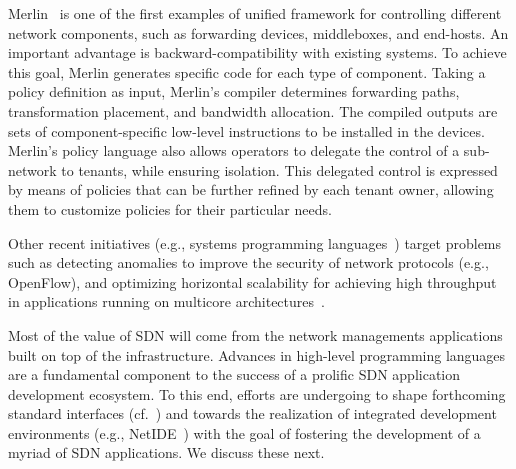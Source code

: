 Merlin~\cite{soule2013} is one of the first examples of unified framework for controlling different network components, such as forwarding devices, middleboxes, and end-hosts.
An important advantage is backward-compatibility with existing systems.
To achieve this goal, Merlin generates specific code for each type of component.
Taking a policy definition as input, Merlin's compiler determines forwarding 
paths, transformation placement, and bandwidth allocation.
The compiled outputs are sets of component-specific 
low-level instructions to be installed in the devices.
Merlin's policy language also allows operators to delegate the control of a sub-network to tenants, while ensuring isolation.
This delegated control is expressed by means of policies that can be further refined 
by each tenant owner, allowing them to customize policies for their particular needs. 

Other recent initiatives (e.g., systems programming languages~\cite{casey2013}) 
target problems such as detecting anomalies to improve the security of network protocols (e.g., OpenFlow), 
and optimizing horizontal scalability for achieving high throughput in applications running on multicore 
architectures~\cite{voellmy2013}.

Most of the value of SDN will come from the network managements applications built on top of the infrastructure.
Advances in high-level programming languages are a fundamental component to the success of a prolific SDN 
application development ecosystem. To this end, efforts are undergoing to shape forthcoming standard 
interfaces (cf.~\cite{kuzniar2013}) and towards the realization of integrated development 
environments (e.g., NetIDE~\cite{facca2013}) with the goal of fostering the development of a myriad of SDN applications.
We discuss these next.

